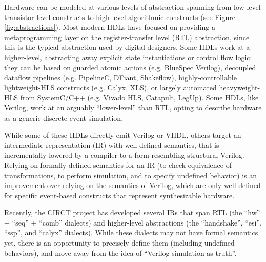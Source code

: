 \documentclass[sigplan,review,nonacm,9pt]{acmart}
\begin{document}

Hardware can be modeled at various levels of abstraction spanning from low-level transistor-level constructs to high-level algorithmic constructs (see Figure \ref{fig:abstractions}).
Most modern HDLs have focused on providing a metaprogramming layer on the register-transfer level (RTL) abstraction, since this is the typical abstraction used by digital designers.
Some HDLs work at a higher-level, abstracting away explicit state instantiations or control flow logic: they can be based on guarded atomic actions (e.g. BlueSpec Verilog\cite{bluespecverilog}), decoupled dataflow pipelines (e.g. PipelineC\cite{pipelinec}, DFiant\cite{dfiant}, Shakeflow\cite{shakeflow}), highly-controllable lightweight-HLS constructs (e.g. Calyx\cite{calyx}, XLS\cite{xls}), or largely automated heavyweight-HLS from SystemC/C++ (e.g. Vivado HLS, Catapult, LegUp\cite{legup}).
Some HDLs, like Verilog, work at an arguably ``lower-level'' than RTL, opting to describe hardware as a generic discrete event simulation.


While some of these HDLs directly emit Verilog or VHDL, others target an intermediate representation (IR) with well defined semantics, that is incrementally lowered by a compiler to a form resembling structural Verilog.
Relying on formally defined semantics for an IR (to check equivalence of transformations, to perform simulation\cite{hwsemantics}, and to specify undefined behavior) is an improvement\cite{cider} over relying on the semantics of Verilog, which are only well defined for specific event-based constructs that represent synthesizable hardware.


Recently, the CIRCT project\cite{circt} has developed several IRs that span RTL (the ``hw'' + ``seq'' + ``comb'' dialects) and higher-level abstractions (the ``handshake'', ``esi'', ``ssp'', and ``calyx''\cite{calyx} dialects).
While these dialects may not have formal semantics yet, there is an opportunity to precisely define them (including undefined behaviors), and move away from the idea of ``Verilog simulation as truth''.
\end{document}
